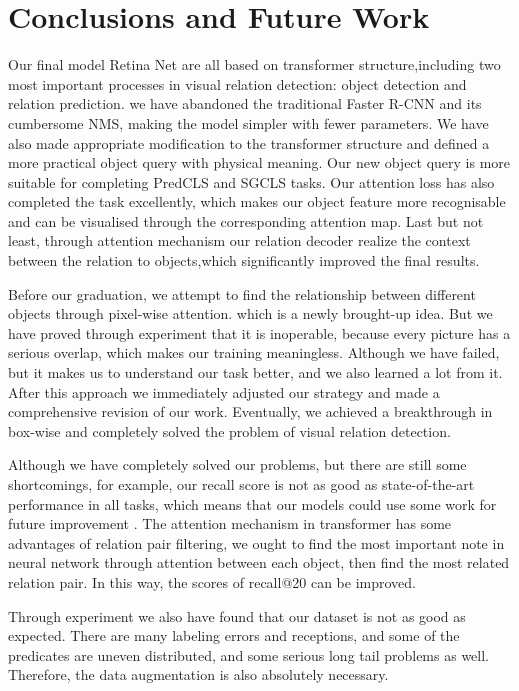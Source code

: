 \chapter{Conclusions and Future Work}
\label{chap:conclusion}
Our final model Retina Net are all based on transformer structure,including two most important processes in visual relation detection: object detection and relation prediction. we have abandoned the traditional Faster R-CNN and its cumbersome NMS, making the model simpler with fewer parameters. We have also made appropriate modification to the transformer structure and defined a more practical object query with physical meaning. Our new object query is more suitable for completing PredCLS and SGCLS tasks. Our attention loss has also completed the task excellently, which makes our object feature more recognisable and can be visualised through the corresponding attention map. Last but not least, through attention mechanism our relation decoder  realize the context between the relation to objects,which significantly improved the final results.

Before our graduation, we attempt to  find the relationship between different objects through pixel-wise attention. which is a newly brought-up idea. But we have proved through experiment that it is inoperable, because every picture has a serious overlap, which makes our training meaningless. Although we have failed, but it makes us to understand our task better, and we also learned a lot from it. After this approach we immediately adjusted our strategy and made a comprehensive revision of our work. Eventually, we achieved a breakthrough in box-wise and completely solved the problem of visual relation detection.

Although we have completely solved our problems, but there are still some shortcomings, for example, our recall score is not as good as state-of-the-art performance in all tasks, which means that our models could use some work for future improvement .  The attention mechanism in transformer has some advantages of relation pair filtering, we ought to find the most important note in neural network through attention between each object, then find the most related relation pair. In this way, the scores of recall@20 can be improved.

Through experiment we also have found that our dataset is not as good as expected. There are many labeling errors and receptions, and some of the predicates are uneven distributed, and some serious long tail problems as well. Therefore, the data augmentation is also absolutely necessary.